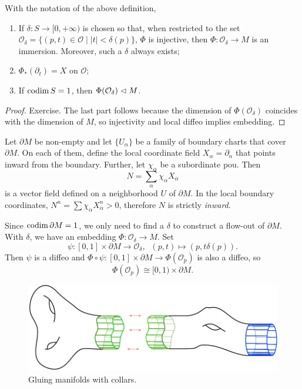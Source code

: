 \begin{thm}
With the notation of the above definition,
\begin{enumerate}
    \item If $\delta:S\to [0,+\infty)$ is chosen so that, when restricted to the set $\mathcal{O}_\delta=\{(p,t)\in\mathcal{O}\mid |t|<\delta(p)\}$, $\Phi$ is injective, then $\Phi:\mathcal{O}_\delta\to M$ is an immersion. Moreover, such a $\delta$ always exists;
    \item $\Phi_\ast (\partial_t)=X$ on $\mathcal{O}$;
    \item If $\operatorname{codim} S=1$, then $\Phi(\mathcal{O}_\delta)\vartriangleleft M$.
\end{enumerate}
\end{thm}
\begin{proof}
    Exercise. The last part follows because the dimension of $\Phi(\mathcal{O}_\delta)$ coincides with the dimension of $M$, so injectivity and local diffeo implies embedding.
\end{proof}

Let $\partial M$ be non-empty and let $\{U_\alpha\}$ be a family of boundary charts that cover $\partial M$. On each of them, define the local coordinate field $X_\alpha=\partial_n$ that points inward from the boundary. Further, let $\chi_\alpha$ be a subordinate \gls{pou}. Then 
\[N=\sum_\alpha \chi_\alpha X_\alpha\]
is a vector field defined on a neighborhood $U$ of $\partial M$. In the local boundary coordinates, $N^n=\sum \chi_\alpha X_\alpha^n>0$, therefore $N$ is strictly \emph{inward}.

Since $\operatorname{codim} \partial M=1$, we only need to find a $\delta$ to construct a flow-out of $\partial M$. With $\delta$, we have an embedding $\Phi:\mathcal{O}_\delta\to M$. Set 
\[\psi:[0,1]\times\partial M\to\mathcal{O}_\delta,\;\; (p,t)\mapsto (p,t\delta(p)).\]
Then $\psi$ is a diffeo and $\Phi\circ\psi:[0,1]\times\partial M\to \Phi(\mathcal{O}_p)$ is also a diffeo, so
\[\Phi(\mathcal{O}_p)\cong [0,1)\times\partial M.\]

\begin{figure}[tp]
    \centering
    \includegraphics[scale=0.2]{figures/collar.png}
    \caption{Gluing manifolds with collars.}
    \label{fig:collars}
\end{figure}

